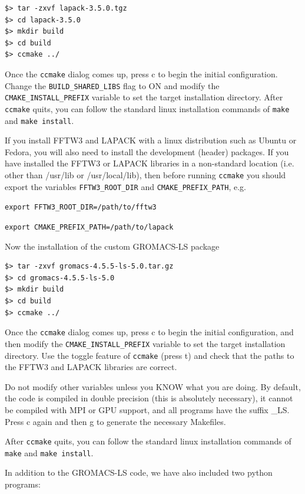 \documentclass[10pt,letterpaper,notitlepage]{article}
\begin{document}
\begin{lstlisting}[caption=Installing LAPACK with CMake]
$> tar -zxvf lapack-3.5.0.tgz
$> cd lapack-3.5.0
$> mkdir build
$> cd build
$> ccmake ../
\end{lstlisting}

Once the \texttt{ccmake} dialog comes up, press c to begin the initial configuration. Change the \texttt{BUILD\_SHARED\_LIBS} flag to ON and modify the \texttt{CMAKE\_INSTALL\_PREFIX} variable to set the target installation directory. After \texttt{ccmake} quits, you can follow the standard linux installation commands of \texttt{make} and \texttt{make install}.

If you install FFTW3 and LAPACK with a linux distribution such as Ubuntu or Fedora, you will also need to install the development (header) packages. If you have installed the FFTW3 or LAPACK libraries in a non-standard location (i.e. other than /usr/lib or /usr/local/lib), then before running \texttt{ccmake} you should export the variables \texttt{FFTW3\_ROOT\_DIR} and \texttt{CMAKE\_PREFIX\_PATH}, e.g.

\texttt{export FFTW3\_ROOT\_DIR=/path/to/fftw3}

\texttt{export CMAKE\_PREFIX\_PATH=/path/to/lapack}

Now the installation of the custom GROMACS-LS package

\begin{lstlisting}[caption=Installing LAPACK with CMake]
$> tar -zxvf gromacs-4.5.5-ls-5.0.tar.gz
$> cd gromacs-4.5.5-ls-5.0
$> mkdir build
$> cd build
$> ccmake ../
\end{lstlisting}

Once the \texttt{ccmake} dialog comes up, press c to begin the initial configuration, and then modify the \texttt{CMAKE\_INSTALL\_PREFIX} variable to set the target installation directory. Use the toggle feature of \texttt{ccmake} (press t) and check that the paths to the FFTW3 and LAPACK libraries are correct.

Do not modify other variables unless you KNOW what you are doing. By default, the code is compiled in double precision (this is absolutely necessary), it cannot be compiled with MPI or GPU support, and all programs have the suffix \_LS. Press c again and then g to generate the necessary Makefiles.

After \texttt{ccmake} quits, you can follow the standard linux installation commands of \texttt{make} and \texttt{make install}.

In addition to the GROMACS-LS code, we have also included two python programs:
\end{document}
